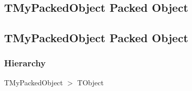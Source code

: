 \documentclass{report}
\begin{document}
\subsection*{\large{\textbf{TMyPackedObject Packed Object}}\normalsize\hspace{1ex}\hrulefill}
\else
\subsection*{TMyPackedObject Packed Object}
\fi
\label{ok_packed_class_object.TMyPackedObject}
\subsubsection*{\large{\textbf{Hierarchy}}\normalsize\hspace{1ex}\hfill}
TMyPackedObject {$>$} TObject
\end{document}
